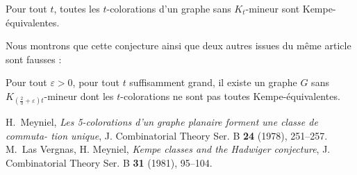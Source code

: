 \documentclass[a4paper,titlepage,12pt,normalheadings,makeidx]{article}
\begin{document}
\begin{conjecture}
  Pour tout $t$, toutes les $t$-colorations d'un graphe sans $K_t$-mineur sont
  Kempe-équivalentes.
\end{conjecture}

Nous montrons que cette conjecture ainsi que deux autres issues du même article
sont fausses :
\begin{theorem}
  Pour tout $\varepsilon > 0$, pour tout $t$ suffisamment grand, il existe un
  graphe $G$ sans $K_{\left(\frac23 + \varepsilon\right)t}$-mineur dont les
  $t$-colorations ne sont pas toutes Kempe-équivalentes.
\end{theorem}

\begin{thebibliography}{99}

H.~Meyniel, \emph{Les 5-colorations d’un graphe planaire forment une classe de commuta-
  tion unique}, J. Combinatorial Theory Ser. B {\bf 24} (1978), 251–257.
M.~Las Vergnas, H. Meyniel, \emph{Kempe classes and the Hadwiger conjecture},
J. Combinatorial Theory Ser. B {\bf 31} (1981), 95–104.

\end{thebibliography}


\vfill
\end{document}
